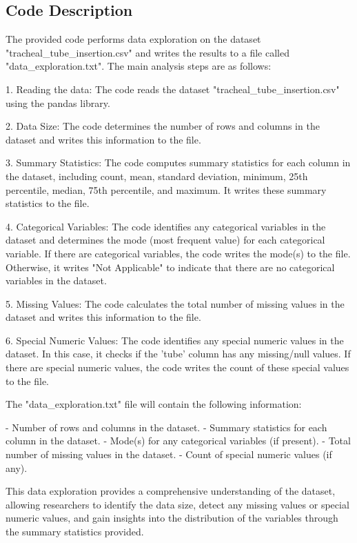 \documentclass[11pt]{article}
\begin{document}
\subsection{Code Description}

The provided code performs data exploration on the dataset "tracheal\_tube\_insertion.csv" and writes the results to a file called "data\_exploration.txt". The main analysis steps are as follows:

1. Reading the data: The code reads the dataset "tracheal\_tube\_insertion.csv" using the pandas library.

2. Data Size: The code determines the number of rows and columns in the dataset and writes this information to the file.

3. Summary Statistics: The code computes summary statistics for each column in the dataset, including count, mean, standard deviation, minimum, 25th percentile, median, 75th percentile, and maximum. It writes these summary statistics to the file.

4. Categorical Variables: The code identifies any categorical variables in the dataset and determines the mode (most frequent value) for each categorical variable. If there are categorical variables, the code writes the mode(s) to the file. Otherwise, it writes "Not Applicable" to indicate that there are no categorical variables in the dataset.

5. Missing Values: The code calculates the total number of missing values in the dataset and writes this information to the file.

6. Special Numeric Values: The code identifies any special numeric values in the dataset. In this case, it checks if the 'tube' column has any missing/null values. If there are special numeric values, the code writes the count of these special values to the file.

The "data\_exploration.txt" file will contain the following information:

- Number of rows and columns in the dataset.
- Summary statistics for each column in the dataset.
- Mode(s) for any categorical variables (if present).
- Total number of missing values in the dataset.
- Count of special numeric values (if any).

This data exploration provides a comprehensive understanding of the dataset, allowing researchers to identify the data size, detect any missing values or special numeric values, and gain insights into the distribution of the variables through the summary statistics provided.
\end{document}
